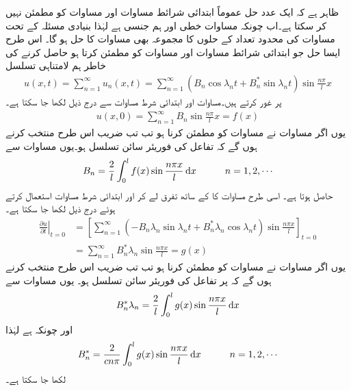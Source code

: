  \quad ظاہر ہے کہ ایک عدد حل  عموماً ابتدائی شرائط مساوات  اور مساوات  کو مطمئن نہیں کر سکتا ہے۔اب چونکہ مساوات  خطی اور ہم جنسی ہے لہٰذا بنیادی مسئلہ  کے تحت مساوات  کی محدود تعداد کے حلوں  کا مجموعہ بھی مساوات  کا حل ہو گا۔  اس طرح ایسا حل جو  ابتدائی شرائط مساوات  اور مساوات  کو مطمئن کرتا ہو حاصل کرنے کی خاطر ہم لامتناہی تسلسل
\begin{align}\label{مساوات_جزوی_مساوات_موج_ڈ}
u(x,t)=\sum_{n=1}^{\infty} u_n(x,t)=\sum_{n=1}^{\infty} (B_n\cos \lambda_n t+B^*_n\sin \lambda_n t)\sin \frac{n\pi}{l}x
\end{align}
پر غور کرتے ہیں۔مساوات  اور ابتدائی شرط مساوات  سے درج ذیل لکھا جا سکتا ہے۔
\begin{align}\label{مساوات_جزوی_مساوات_موج_ذ}
u(x,0)=\sum_{n=1}^{\infty} B_n\sin \frac{n\pi}{l}x=f(x)
\end{align} 
یوں اگر مساوات  نے مساوات  کو مطمئن کرنا ہو تب تب  ضریب    اس طرح منتخب کرنے ہوں گے کہ  تفاعل  کی فوریئر سائن تسلسل ہو۔یوں  مساوات  سے
\begin{align}\label{مساوات_جزوی_مساوات_موج_ر}
B_n=\frac{2}{l}\int_0^l f(x)\sin \frac{n\pi x}{l}\dif x\quad \quad \quad n=1,2,\cdots
\end{align}
حاصل ہوتا ہے۔
اسی طرح مساوات  کا  کے ساتھ تفرق لے کر اور ابتدائی شرط  مساوات  استعمال کرتے ہوئے درج ذیل لکھا جا سکتا ہے۔ 
\begin{align*}
\left. \frac{\partial u}{\partial t}\right|_{t=0}&=\left[\sum_{n=1}^{\infty} (-B_n\lambda_n\sin \lambda_nt+B^*_n\lambda_n\cos \lambda_nt)\sin\frac{n\pi x}{l}\right]_{t=0}\\
&=\sum_{n=1}^{\infty} B^*_n\lambda_n\sin\frac{n\pi x}{l} =g(x)
\end{align*}
یوں اگر مساوات  نے مساوات  کو مطمئن کرنا ہو تب تب  ضریب    اس طرح منتخب کرنے ہوں گے کہ  پر   تفاعل  کی فوریئر سائن تسلسل ہو۔ یوں مساوات  سے 
\begin{align*}
B^*_n\lambda_n=\frac{2}{l}\int_0^l g(x)\sin \frac{n\pi x}{l} \dif x
\end{align*}
اور چونکہ  ہے لہٰذا
\begin{align}\label{مساوات_جزوی_مساوات_موج_ڑ}
B^*_n=\frac{2}{cn\pi}\int_0^l g(x)\sin \frac{n\pi x}{l}\dif x\quad \quad \quad n=1,2,\cdots
\end{align}
لکھا جا سکتا ہے۔

